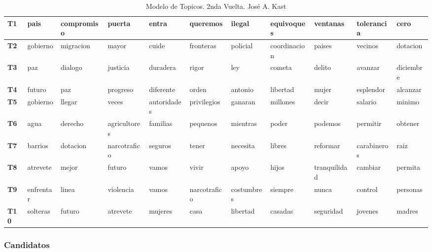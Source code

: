 \documentclass[
  10pt,
  letterpaper,
]{report}
\begin{document}
\begin{table}[!h]

\caption{\label{tab:Tabla11_pc}Modelo de Topicos. 2nda Vuelta. José A. Kast }
\centering
\fontsize{6}{8}\selectfont
\begin{tabular}[t]{>{\raggedright\arraybackslash}p{0.08in}|>{\raggedright\arraybackslash}p{0.4in}|>{\raggedright\arraybackslash}p{0.4in}|>{\raggedright\arraybackslash}p{0.4in}|>{\raggedright\arraybackslash}p{0.4in}|>{\raggedright\arraybackslash}p{0.4in}|>{\raggedright\arraybackslash}p{0.4in}|>{\raggedright\arraybackslash}p{0.4in}|>{\raggedright\arraybackslash}p{0.4in}|>{\raggedright\arraybackslash}p{0.4in}|l}
\hline
T1 & pais & compromiso & puerta & entra & queremos & ilegal & equivoques & ventanas & tolerancia & cero\\
\hline
\textbf{T2} & gobierno & migracion & mayor & cuide & fronteras & policial & coordinacion & paises & vecinos & dotacion\\
\hline
\textbf{T3} & paz & dialogo & justicia & duradera & rigor & ley & cometa & delito & avanzar & diciembre\\
\hline
\textbf{T4} & futuro & paz & progreso & diferente & orden & antonio & libertad & mujer & esplendor & alcanzar\\
\hline
\textbf{T5} & gobierno & llegar & veces & autoridades & privilegios & ganaran & millones & decir & salario & minimo\\
\hline
\textbf{T6} & agua & derecho & agricultores & familias & pequenos & mientras & poder & podemos & permitir & obtener\\
\hline
\textbf{T7} & barrios & dotacion & narcotrafico & seguros & tener & necesita & libres & reformar & carabineros & raiz\\
\hline
\textbf{T8} & atrevete & mejor & futuro & vamos & vivir & apoyo & hijos & tranquilidad & cambiar & permita\\
\hline
\textbf{T9} & enfrentar & linea & violencia & vamos & narcotrafico & costumbres & siempre & nunca & control & personas\\
\hline
\textbf{T10} & solteras & futuro & atrevete & mujeres & casa & libertad & casadas & seguridad & jovenes & madres\\
\hline
\end{tabular}
\end{table}

\hypertarget{candidatos-1}{%
\subsubsection{Candidatos}\label{candidatos-1}}
\end{document}
